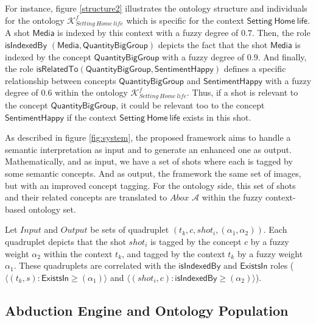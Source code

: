 		For instance, figure \ref{structure2} illustrates the ontology
		structure and individuals for the ontology $\mathcal{K}^{f}_{Setting~Home~life}$
		which is specific for the context $\mathsf{Setting~Home~life}$.
		A shot $\mathsf{Media}$ is indexed by this context with a fuzzy
		degree of $0.7$. Then, the role $\mathsf{isIndexedBy}$ $\mathsf{(Media, Quantity Big Group)}$
		depicts the fact that the shot $\mathsf{Media}$
		is indexed by the concept $\mathsf{Quantity Big Group}$ with a fuzzy
		degree of $0.9$. And finally, 
		the role $\mathsf{isRelatedTo(Quantity Big Group,Sentiment Happy)}$ 
		defines a specific relationship between concepts $\mathsf{Quantity Big Group}$ and 
		$\mathsf{Sentiment Happy}$ with a fuzzy 
		degree of $0.6$ within the ontology $\mathcal{K}^{f}_{Setting~Home~life}$. Thus, if a shot is relevant to the concept 
		$\mathsf{Quantity Big Group}$, it could be relevant too to the concept $\mathsf{Sentiment Happy}$ 
		if the context $\mathsf{Setting~Home~life}$ exists in this shot.

		As described in figure \ref{fig:system}, the proposed framework aims to handle a semantic interpretation 
		as input and to generate an enhanced one as output. Mathematically, and as input, we have a set of shots 
		where each  is tagged by some semantic concepts. And as output, the framework  the same 
		set of images, but with an improved concept tagging. For the ontology side, this set of shots and their 
		related concepts are translated to $Abox$ $\mathcal{A}$ within the fuzzy context-based ontology set. 
		
		\begin{definition}Let $Input$ and $Output$ be sets of quadruplet $(t_{k},c,shot_{i},(\alpha_{1}, \alpha_{2}))$. 
		Each quadruplet depicts that the shot $shot_{i}$ is tagged by the concept $c$ by a fuzzy weight 
		$\alpha_{2}$ within the context $t_{k}$, and tagged by the context $t_{k}$ by a fuzzy weight $\alpha_{1}$.
 		These quadruplets are correlated with the $\mathsf{isIndexedBy}$ and $\mathsf{ExistsIn}$ roles ($\langle(t_{k},s): 
		\mathsf{ExistsIn} \geqslant (\alpha_{1})\rangle$ and $\langle(shot_{i},c) : \mathsf{isIndexedBy} 
		\geqslant (\alpha_{2})\rangle$).
		\end{definition}
		
		\subsection{Abduction Engine and Ontology Population}

